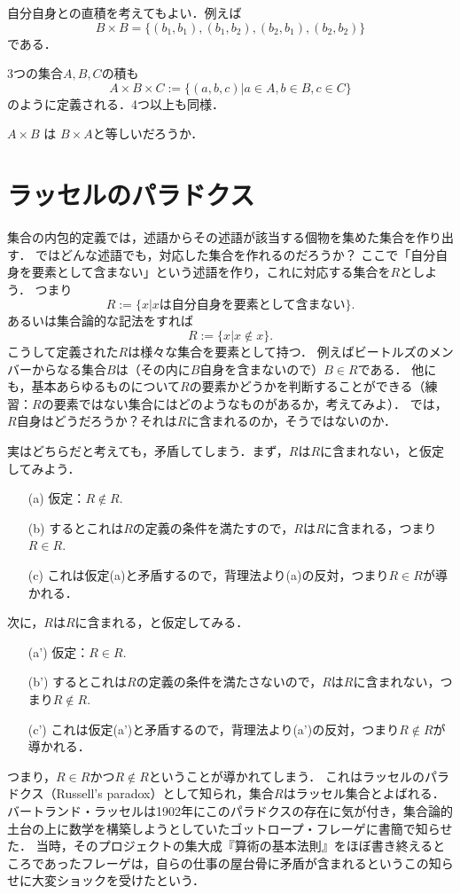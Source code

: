 \documentclass[11pt,a4paper]{jsarticle}
\begin{document}
自分自身との直積を考えてもよい．例えば
\[
B \times B = \{(b_1, b_1), (b_1, b_2), (b_2, b_1), (b_2, b_2)\}
\]
である．

3つの集合$A, B, C$の積も
\[
 A \times B \times C := \{ (a, b, c) | a \in A, b \in B, c \in C \}
\]
のように定義される．4つ以上も同様．


\begin{exercise}
$A \times B$ は $B \times A$と等しいだろうか．
\end{exercise} 

%


\section{ラッセルのパラドクス}
集合の内包的定義では，述語からその述語が該当する個物を集めた集合を作り出す．
ではどんな述語でも，対応した集合を作れるのだろうか？
ここで「自分自身を要素として含まない」という述語を作り，これに対応する集合を$R$としよう．
つまり
\[
 R := \{x | x \text{は自分自身を要素として含まない}\}.
\]
あるいは集合論的な記法をすれば
\[
 R := \{x | x \not \in x\}.
\]
こうして定義された$R$は様々な集合を要素として持つ．
例えばビートルズのメンバーからなる集合$B$は（その内に$B$自身を含まないので）$B \in R$である．
他にも，基本あらゆるものについて$R$の要素かどうかを判断することができる（練習：$R$の要素ではない集合にはどのようなものがあるか，考えてみよ）．
では，$R$自身はどうだろうか？それは$R$に含まれるのか，そうではないのか．

実はどちらだと考えても，矛盾してしまう．まず，$R$は$R$に含まれない，と仮定してみよう．
\begin{itemize}
 \item[(a)] 仮定：$R \not\in R$.
 \item[(b)] するとこれは$R$の定義の条件を満たすので，$R$は$R$に含まれる，つまり$R \in R$.
 \item[(c)] これは仮定(a)と矛盾するので，背理法より(a)の反対，つまり$R \in R$が導かれる．
\end{itemize}
次に，$R$は$R$に含まれる，と仮定してみる．
\begin{itemize}
 \item[(a')] 仮定：$R \in R$.
 \item[(b')] するとこれは$R$の定義の条件を満たさないので，$R$は$R$に含まれない，つまり$R \not\in R$.
 \item[(c')] これは仮定(a')と矛盾するので，背理法より(a')の反対，つまり$R \not\in R$が導かれる．
\end{itemize}
つまり，$R \in R$かつ$R \not\in R$ということが導かれてしまう．
これはラッセルのパラドクス（Russell's paradox）として知られ，集合$R$はラッセル集合とよばれる．
バートランド・ラッセルは1902年にこのパラドクスの存在に気が付き，集合論的土台の上に数学を構築しようとしていたゴットロープ・フレーゲに書簡で知らせた．
当時，そのプロジェクトの集大成『算術の基本法則』をほぼ書き終えるところであったフレーゲは，自らの仕事の屋台骨に矛盾が含まれるというこの知らせに大変ショックを受けたという．
\end{document}
